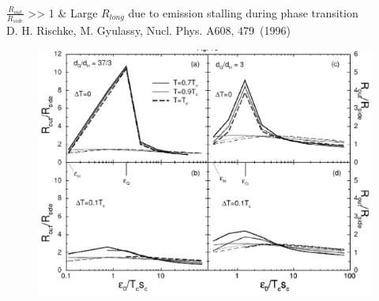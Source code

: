 \documentclass[dvipsnames] {beamer}
\begin{document}
      \begin{frame}
        \bf 
        \vskip -0.75cm
        \frametitle{\bf {}}
        \begin{columns}[t]
          \begin{block}{\bf {}}
            
            \vskip 0.15cm
            $\frac{R_{out}}{R_{side}}$ >> 1 \& Large $R_{long}$ due to emission stalling during phase transition \\
            \vskip 0.25cm
                   {\color{blue} D. H. Rischke, M. Gyulassy,  Nucl. Phys. A608, 479~(1996)}
                   \begin{figure}[H]
                     \includegraphics[width=1.\linewidth]{1pt-emissionDuration.eps}
                   \end{figure}
          \end{block}
          

\end{columns}
\end{frame}
\end{document}
